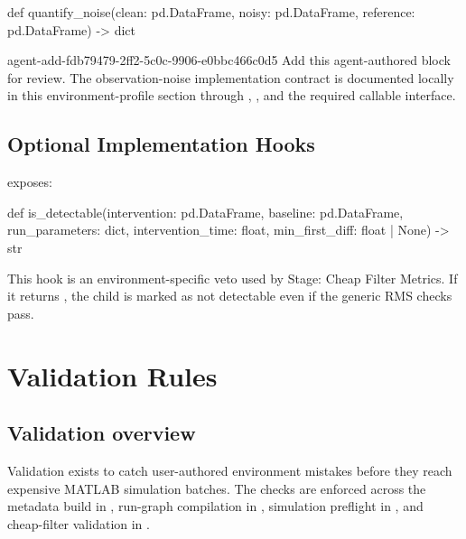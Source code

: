 \documentclass[11pt]{article}
\begin{document}
\begin{DocCode}
def quantify_noise(clean: pd.DataFrame, noisy: pd.DataFrame, reference: pd.DataFrame) -> dict
\end{DocCode}

\agentProposedEdit
  {agent-add-fdb79479-2ff2-5c0c-9906-e0bbc466c0d5}
  {Add this agent-authored block for review.}
  {}
  {The observation-noise implementation contract is documented locally in this environment-profile section through , , and the required callable interface.}

\label{sec:environment-detectability-specific}
\subsection*{Optional Implementation Hooks}

 exposes:

\begin{DocCode}
def is_detectable(intervention: pd.DataFrame, baseline: pd.DataFrame, run_parameters: dict, intervention_time: float, min_first_diff: float | None) -> str
\end{DocCode}

This hook is an environment-specific veto used by Stage: Cheap Filter Metrics.
If it returns , the child is marked as not detectable even if the generic RMS checks pass.


\section*{Validation Rules}
\label{sec:environment-validation-rules}

\subsection*{Validation overview}

Validation exists to catch user-authored environment mistakes before they reach expensive MATLAB simulation batches.
The checks are enforced across the metadata build in , run-graph compilation in , simulation preflight in , and cheap-filter validation in .
\end{document}
